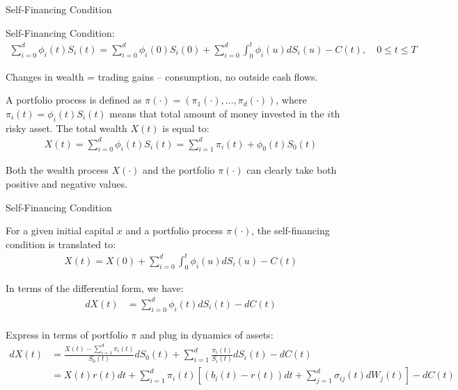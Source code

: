 \documentclass{beamer}
\begin{document}
\begin{frame}{Self-Financing Condition}

    {\footnotesize \footnotesize
    \par Self-Financing Condition:
    \begin{align*}
        \sum_{i=0}^d \phi_i(t)S_i(t) = \sum_{i=0}^d \phi_i(0)S_i(0) + \sum_{i=0}^d \int_0^t \phi_i(u) dS_i(u) - C(t), \quad 0 \leq t \leq T
    \end{align*}
    \par Changes in wealth = trading gains – consumption, no outside cash flows.
    \vspace{1em}
    \par  \pause A portfolio process is defined as $\pi(\cdot) = (\pi_1(\cdot), \ldots, \pi_d(\cdot))$, where $\pi_i(t) = \phi_i(t) S_i(t)$ means that 
    total amount of money invested in the $i$th risky asset. The total wealth $X(t)$ is equal to:
    \begin{align*}
        X(t) = \sum_{i=0}^d \phi_i(t) S_i(t) = \sum_{i=1}^d \pi_i(t) + \phi_0(t) S_0(t)
    \end{align*}
    \par Both the wealth process $X(\cdot)$ and the portfolio $\pi(\cdot)$ can clearly take both positive and negative values.
    }   
\end{frame}

\begin{frame}{Self-Financing Condition}

    {\footnotesize \footnotesize
    \par For a given initial capital \( x \) and a portfolio process \( \pi(\cdot) \), the self-financing condition is translated to:
    \begin{align*}
        X(t) = X(0) + \sum_{i=0}^{d} \int_{0}^{t} \phi_i(u) dS_i(u) - C(t)
    \end{align*}
    \par In terms of the differential form, we have:
    \begin{align*}
        dX(t) &= \sum_{i=0}^{d} \phi_i(t) dS_i(t) - dC(t) \\
    \end{align*}
    \vspace{-2em}
    \par Express in terms of portfolio $\pi$ and plug in dynamics of assets:
    \begin{align*}
        dX(t) &= \frac{X(t) - \sum_{i=1}^{d} \pi_i(t)}{S_0(t)} dS_0(t) + \sum_{i=1}^{d} \frac{\pi_i(t)}{S_i(t)} dS_i(t) - dC(t) \\
        &= X(t) r(t) dt + \sum_{i=1}^{d} \pi_i(t) \left[ (b_i(t) - r(t)) dt + \sum_{j=1}^{d} \sigma_{ij}(t) dW_j(t) \right] - dC(t)
    \end{align*}
    }   
\end{frame} 
\end{document}
